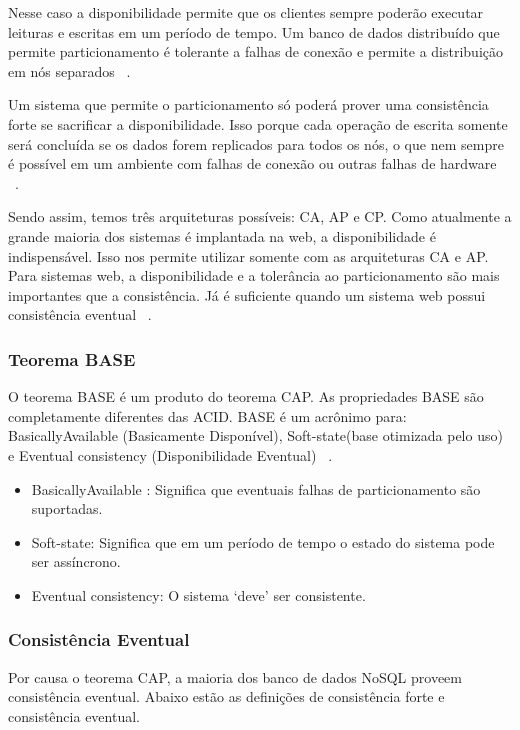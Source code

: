 Nesse caso a disponibilidade permite que os clientes sempre poderão executar leituras e escritas em um período de tempo. Um banco de dados distribuído que permite particionamento é tolerante a falhas de conexão e permite a distribuição em nós separados ~\cite{Orendanalysisand}.

Um sistema que permite o particionamento só poderá prover uma consistência forte se sacrificar a disponibilidade. Isso porque cada operação de escrita somente será concluída se os dados forem replicados para todos os nós, o que nem sempre é possível em um ambiente com falhas de conexão ou outras falhas de hardware ~\cite{Orendanalysisand}.

Sendo assim, temos três arquiteturas possíveis: CA, AP e CP. Como atualmente a grande maioria dos sistemas é implantada na web, a disponibilidade é indispensável. Isso nos permite utilizar somente com as arquiteturas CA e AP. Para sistemas web, a disponibilidade e a tolerância ao particionamento são mais importantes que a consistência. Já é suficiente quando um sistema web possui consistência eventual ~\cite{nosqlaplicassandra}.

\subsubsection{Teorema BASE}

O teorema BASE é um produto do teorema CAP. As propriedades BASE são completamente diferentes das ACID. BASE é um acrônimo para: BasicallyAvailable (Basicamente Disponível), Soft-state(base otimizada pelo uso) e Eventual consistency (Disponibilidade Eventual) ~\cite{nosqlaplicassandra}.

\begin{itemize}
\item BasicallyAvailable : Significa que eventuais falhas de particionamento são suportadas.
\item Soft-state: Significa que em um período de tempo o estado do sistema pode ser assíncrono.
\item Eventual consistency: O sistema ‘deve’ ser consistente.
\end{itemize}

\subsubsection{Consistência Eventual}

Por causa o teorema CAP, a maioria dos banco de dados NoSQL proveem consistência eventual. Abaixo estão as definições de consistência forte e consistência eventual.

